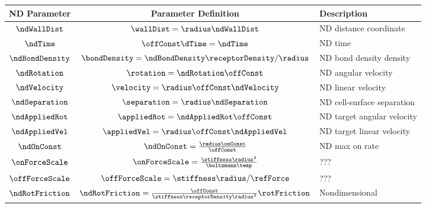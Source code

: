 \begin{table}
  \centering
  \begin{tabular}{c|c|l}
    ND Parameter & Parameter Definition & Description \\
    \hline
    $\ndWallDist$ & $\wallDist = \radius\ndWallDist$ & ND distance
                                                       coordinate \\
    $\ndTime$ & $\offConst \dTime = \ndTime$ & ND time \\ 
    $\ndBondDensity$ & $\bondDensity = \ndBondDensity
                       \receptorDensity/\radius$ & ND bond density
                                                   density \\
    $\ndRotation$ & $\rotation = \ndRotation \offConst$ & ND angular
                                                          velocity \\
    $\ndVelocity$ & $\velocity = \radius \offConst \ndVelocity$ & ND
                                                                  linear
                                                                  velocity
    \\ 
    $\ndSeparation$ & $\separation = \radius \ndSeparation$ & ND
                                                              cell-surface
                                                              separation
    \\ 
    $\ndAppliedRot$ & $\appliedRot = \ndAppliedRot \offConst$ & ND
                                                                target
                                                                angular
                                                                velocity \\
    $\ndAppliedVel$ & $\appliedVel = \radius \offConst \ndAppliedVel$
                                        & ND target linear velocity \\ 
    $\ndOnConst$ & $\ndOnConst = \frac{\radius \onConst}{\offConst}$
                                        & ND max on rate \\
    $\onForceScale$ & $\onForceScale = \frac{\stiffness
                      \radius^2}{\boltzmann \temp}$ & ??? \\
    $\offForceScale$ & $\offForceScale = \stiffness \radius/\refForce$
                                        & ??? \\
    $\ndRotFriction$ & $\ndRotFriction = \frac{\offConst}{\stiffness
                       \receptorDensity \radius^2} \rotFriction$ &
                                                                   Nondimensional

\end{tabular}
\end{table}
